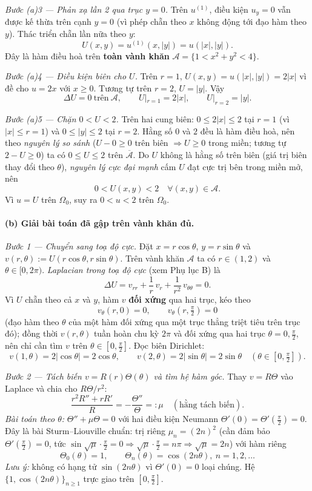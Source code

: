 \emph{Bước (a)3 --- Phản xạ lần 2 qua trục $y=0$.} Trên $u^{(1)}$, điều kiện $u_y=0$ vẫn được kế thừa trên cạnh $y=0$ (vì phép chẵn theo $x$ không động tới đạo hàm theo $y$). Thác triển chẵn lần nữa theo $y$:
\[
  U(x,y)=u^{(1)}(x,|y|)=u(|x|,|y|).
\]
Đây là hàm điều hoà trên \textbf{toàn vành khăn} $\mathcal A=\{1<x^2+y^2<4\}$.

\emph{Bước (a)4 --- Điều kiện biên cho $U$.} Trên $r=1$, $U(x,y)=u(|x|,|y|)=2|x|$ vì đề cho $u=2x$ với $x\ge0$. Tương tự trên $r=2$, $U=|y|$. Vậy
\[
  \Delta U=0\ \text{trên}\ \mathcal A,\qquad U|_{r=1}=2|x|,\qquad U|_{r=2}=|y|.
\]

\emph{Bước (a)5 --- Chặn $0<U<2$.} Trên hai cung biên: $0\le 2|x|\le 2$ tại $r=1$ (vì $|x|\le r=1$) và $0\le|y|\le 2$ tại $r=2$. Hằng số $0$ và $2$ đều là hàm điều hoà, nên theo \emph{nguyên lý so sánh} ($U-0\ge0$ trên biên $\Rightarrow U\ge0$ trong miền; tương tự $2-U\ge0$) ta có $0\le U\le 2$ trên $\overline{\mathcal A}$. Do $U$ không là hằng số trên biên (giá trị biên thay đổi theo $\theta$), \emph{nguyên lý cực đại mạnh} cấm $U$ đạt cực trị bên trong miền mở, nên
\[
  0<U(x,y)<2\quad\forall (x,y)\in\mathcal A.
\]
Vì $u=U$ trên $\Omega_0$, suy ra $0<u<2$ trên $\Omega_0$.

\paragraph{(b) Giải bài toán đã gập trên vành khăn đủ.}\leavevmode

\emph{Bước 1 --- Chuyển sang toạ độ cực.} Đặt $x=r\cos\theta$, $y=r\sin\theta$ và $v(r,\theta):=U(r\cos\theta,r\sin\theta)$. Trên vành khăn $\mathcal A$ ta có $r\in(1,2)$ và $\theta\in[0,2\pi)$. \emph{Laplacian trong toạ độ cực} (xem Phụ lục B) là
\[
  \Delta U=v_{rr}+\frac{1}{r}\,v_r+\frac{1}{r^2}\,v_{\theta\theta}=0.
\]
Vì $U$ chẵn theo cả $x$ và $y$, hàm $v$ \textbf{đối xứng} qua hai trục, kéo theo
\[
  v_\theta(r,0)=0,\qquad v_\theta(r,\tfrac{\pi}{2})=0
\]
(đạo hàm theo $\theta$ của một hàm đối xứng qua một trục thẳng triệt tiêu trên trục đó); đồng thời $v(r,\theta)$ tuần hoàn chu kỳ $2\pi$ và đối xứng qua hai trục $\theta=0,\tfrac{\pi}{2}$, nên chỉ cần tìm $v$ trên $\theta\in[0,\tfrac{\pi}{2}]$. Đọc biên Dirichlet:
\[
  v(1,\theta)=2|\cos\theta|=2\cos\theta,\qquad v(2,\theta)=2|\sin\theta|=2\sin\theta\quad(\theta\in[0,\tfrac{\pi}{2}]).
\]

\emph{Bước 2 --- Tách biến $v=R(r)\Theta(\theta)$ và tìm hệ hàm góc.} Thay $v=R\Theta$ vào Laplace và chia cho $R\Theta/r^2$:
\[
  \frac{r^2 R''+rR'}{R}=-\frac{\Theta''}{\Theta}=:\mu\quad(\text{hằng tách biến}).
\]
\emph{Bài toán theo $\theta$:} $\Theta''+\mu\Theta=0$ với hai điều kiện Neumann $\Theta'(0)=\Theta'(\tfrac{\pi}{2})=0$. Đây là bài Sturm--Liouville chuẩn: trị riêng $\mu_n=(2n)^2$ (cần đảm bảo $\Theta'(\tfrac{\pi}{2})=0$, tức $\sin\!\sqrt{\mu}\cdot\tfrac{\pi}{2}=0\Rightarrow\sqrt\mu\cdot\tfrac{\pi}{2}=n\pi\Rightarrow\sqrt\mu=2n$) với hàm riêng
\[
  \Theta_0(\theta)=1,\qquad \Theta_n(\theta)=\cos(2n\theta),\ n=1,2,\dots
\]
\emph{Lưu ý:} không có hạng tử $\sin(2n\theta)$ vì $\Theta'(0)=0$ loại chúng. Hệ $\{1,\cos(2n\theta)\}_{n\ge1}$ trực giao trên $[0,\tfrac{\pi}{2}]$.

